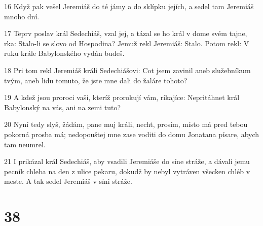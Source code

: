 \par 16 Když pak vešel Jeremiáš do té jámy a do sklípku jejích, a sedel tam Jeremiáš mnoho dní.
\par 17 Teprv poslav král Sedechiáš, vzal jej, a tázal se ho král v dome svém tajne, rka: Stalo-li se slovo od Hospodina? Jemuž rekl Jeremiáš: Stalo. Potom rekl: V ruku krále Babylonského vydán budeš.
\par 18 Pri tom rekl Jeremiáš králi Sedechiášovi: Cot jsem zavinil aneb služebníkum tvým, aneb lidu tomuto, že jste mne dali do žaláre tohoto?
\par 19 A kdež jsou proroci vaši, kteríž prorokují vám, ríkajíce: Nepritáhnet král Babylonský na vás, ani na zemi tuto?
\par 20 Nyní tedy slyš, žádám, pane muj králi, necht, prosím, místo má pred tebou pokorná prosba má; nedopouštej mne zase voditi do domu Jonatana písare, abych tam neumrel.
\par 21 I prikázal král Sedechiáš, aby vsadili Jeremiáše do síne stráže, a dávali jemu pecník chleba na den z ulice pekaru, dokudž by nebyl vytráven všecken chléb v meste. A tak sedel Jeremiáš v síni stráže.

\chapter{38}

